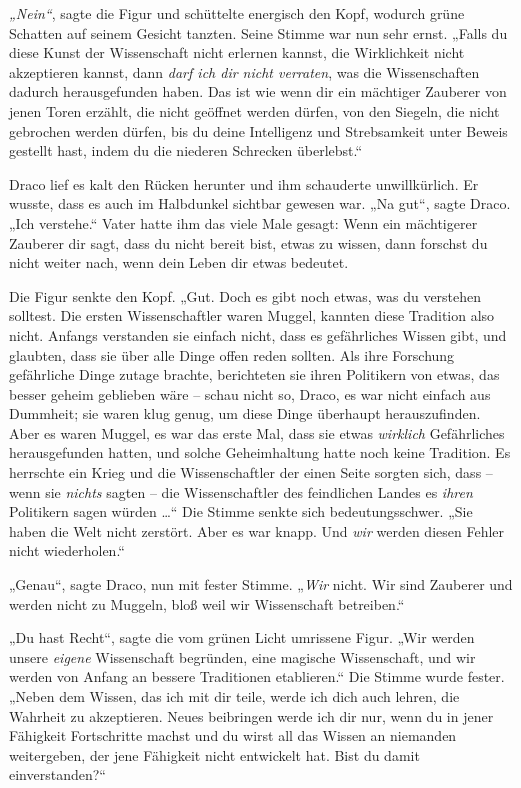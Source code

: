 {\emph{„Nein“}, sagte die Figur und schüttelte energisch den Kopf, wodurch grüne Schatten auf seinem Gesicht tanzten. Seine Stimme war nun sehr ernst. „Falls du diese Kunst der Wissenschaft nicht erlernen kannst, die Wirklichkeit nicht akzeptieren kannst, dann \emph{darf ich dir nicht verraten}, was die Wissenschaften dadurch herausgefunden haben. Das ist wie wenn dir ein mächtiger Zauberer von jenen Toren erzählt, die nicht geöffnet werden dürfen, von den Siegeln, die nicht gebrochen werden dürfen, bis du deine Intelligenz und Strebsamkeit unter Beweis gestellt hast, indem du die niederen Schrecken überlebst.“

Draco lief es kalt den Rücken herunter und ihm schauderte unwillkürlich. Er wusste, dass es auch im Halbdunkel sichtbar gewesen war. „Na gut“, sagte Draco. „Ich verstehe.“ Vater hatte ihm das viele Male gesagt: Wenn ein mächtigerer Zauberer dir sagt, dass du nicht bereit bist, etwas zu wissen, dann forschst du nicht weiter nach, wenn dein Leben dir etwas bedeutet.

Die Figur senkte den Kopf. „Gut. Doch es gibt noch etwas, was du verstehen solltest. Die ersten Wissenschaftler waren Muggel, kannten diese Tradition also nicht. Anfangs verstanden sie einfach nicht, dass es gefährliches Wissen gibt, und glaubten, dass sie über alle Dinge offen reden sollten. Als ihre Forschung gefährliche Dinge zutage brachte, berichteten sie ihren Politikern von etwas, das besser geheim geblieben wäre -- schau nicht so, Draco, es war nicht einfach aus Dummheit; sie waren klug genug, um diese Dinge überhaupt herauszufinden. Aber es waren Muggel, es war das erste Mal, dass sie etwas \emph{wirklich} Gefährliches herausgefunden hatten, und solche Geheimhaltung hatte noch keine Tradition. Es herrschte ein Krieg und die Wissenschaftler der einen Seite sorgten sich, dass -- wenn sie \emph{nichts} sagten -- die Wissenschaftler des feindlichen Landes es \emph{ihren} Politikern sagen würden …“ Die Stimme senkte sich bedeutungsschwer. „Sie haben die Welt nicht zerstört. Aber es war knapp. Und \emph{wir} werden diesen Fehler nicht wiederholen.“

„Genau“, sagte Draco, nun mit fester Stimme. „\emph{Wir} nicht. Wir sind Zauberer und werden nicht zu Muggeln, bloß weil wir Wissenschaft betreiben.“

„Du hast Recht“, sagte die vom grünen Licht umrissene Figur. „Wir werden unsere \emph{eigene} Wissenschaft begründen, eine magische Wissenschaft, und wir werden von Anfang an bessere Traditionen etablieren.“ Die Stimme wurde fester. „Neben dem Wissen, das ich mit dir teile, werde ich dich auch lehren, die Wahrheit zu akzeptieren. Neues beibringen werde ich dir nur, wenn du in jener Fähigkeit Fortschritte machst und du wirst all das Wissen an niemanden weitergeben, der jene Fähigkeit nicht entwickelt hat. Bist du damit einverstanden?“

}
